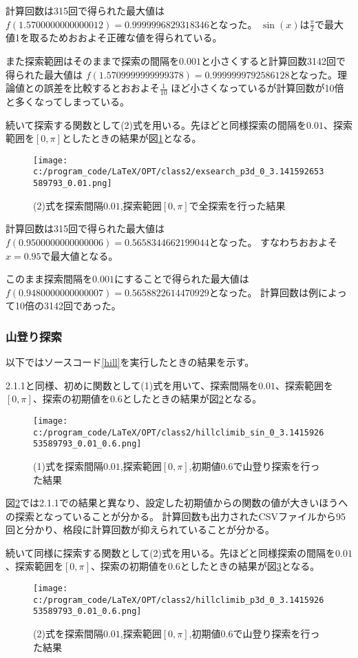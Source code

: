 \documentclass[a4paper,11pt,dvipdfmx]{jsarticle}
\begin{document}
計算回数は315回で得られた最大値は$f(1.5700000000000012)=0.9999996829318346$となった。
$\sin(x)$は$\frac{\pi}{2}$で最大値1を取るためおおよそ正確な値を得られている。

また探索範囲はそのままで探索の間隔を$0.001$と小さくすると計算回数3142回で得られた最大値は
$f(1.5709999999999378)=0.9999999792586128$となった。理論値との誤差を比較するとおおよそ$\frac{1}{10}$
ほど小さくなっているが計算回数が10倍と多くなってしまっている。

続いて探索する関数として(2)式を用いる。先ほどと同様探索の間隔を$0.01$、探索範囲を$[0,\pi]$としたときの結果が図\ref{ep0p0.01}となる。
\begin{figure}[h]
    \centering
    \texttt{[image: c:/program\_code/LaTeX/OPT/class2/exsearch\_p3d\_0\_3.141592653589793\_0.01.png]}
    \caption{(2)式を探索間隔$0.01$,探索範囲$[0,\pi]$で全探索を行った結果}
    \label{ep0p0.01}
\end{figure}

計算回数は315回で得られた最大値は$f(0.9500000000000006)=0.5658344662199044$となった。
すなわちおおよそ$x=0.95$で最大値となる。

このまま探索間隔を$0.001$にすることで得られた最大値は$f(0.9480000000000007)=0.5658822614470929$となった。
計算回数は例によって10倍の3142回であった。

\subsubsection{山登り探索}
以下ではソースコード\ref{hill}を実行したときの結果を示す。

2.1.1と同様、初めに関数として(1)式を用いて、探索間隔を$0.01$、探索範囲を$[0,\pi]$、探索の初期値を$0.6$としたときの結果が図\ref{hs0p0.010.6}となる。
\begin{figure}[h]
    \centering
    \texttt{[image: c:/program\_code/LaTeX/OPT/class2/hillclimib\_sin\_0\_3.141592653589793\_0.01\_0.6.png]}
    \caption{(1)式を探索間隔$0.01$,探索範囲$[0,\pi]$,初期値$0.6$で山登り探索を行った結果}
    \label{hs0p0.010.6}
\end{figure}

図\ref{hs0p0.010.6}では2.1.1での結果と異なり、設定した初期値からの関数の値が大きいほうへの探索となっていることが分かる。
計算回数も出力されたCSVファイルから95回と分かり、格段に計算回数が抑えられていることが分かる。

続いて同様に探索する関数として(2)式を用いる。先ほどと同様探索の間隔を$0.01$、探索範囲を$[0,\pi]$、探索の初期値を$0.6$としたときの結果が図\ref{hp0p0.010.6}となる。
\begin{figure}[h]
    \centering
    \texttt{[image: c:/program\_code/LaTeX/OPT/class2/hillclimib\_p3d\_0\_3.141592653589793\_0.01\_0.6.png]}
    \caption{(2)式を探索間隔$0.01$,探索範囲$[0,\pi]$,初期値$0.6$で山登り探索を行った結果}
    \label{hp0p0.010.6}
\end{figure}
\end{document}
